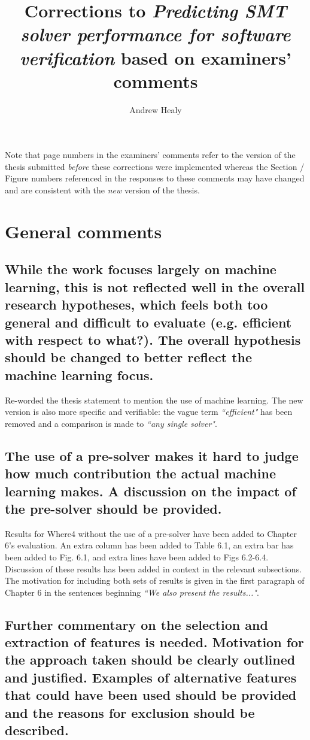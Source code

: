 \documentclass[]{article}
\title{Corrections to \emph{Predicting SMT solver performance for software verification} based on examiners' comments}
\author{Andrew Healy}
\begin{document}
\maketitle

Note that page numbers in the examiners' comments refer to the version of the thesis submitted \emph{before} these corrections were implemented whereas the Section / Figure numbers referenced in the responses to these comments may have changed and are consistent with the \emph{new} version of the thesis. 

\section{General comments}

\subsection{While the work focuses largely on machine learning, this is not reflected well in the overall research hypotheses, which feels both too general and difficult to evaluate (e.g. efficient with respect to what?). The overall hypothesis should be changed to better reflect the machine learning focus.}

\label{thesis-statement}

Re-worded the thesis statement to mention the use of machine learning. 
The new version is also more specific and verifiable: the vague term \emph{``efficient"} has been removed and a comparison is made to \emph{``any single solver"}.
 
\subsection{The use of a pre-solver makes it hard to judge how much contribution the actual machine learning makes. A discussion on the impact of the pre-solver should be provided.}
\label{presolving}
	
Results for \textsf{Where4} without the use	of a pre-solver have been added to Chapter 6's evaluation. An extra column has been added to Table 6.1, an extra bar has been added to Fig. 6.1, and extra lines have been added to Figs 6.2-6.4. Discussion of these results has been added in context in the relevant subsections. The motivation for including both sets of results is given in the first paragraph of Chapter 6 in the sentences beginning \emph{``We also present the results..."}.
	
\subsection{Further commentary on the selection and extraction of features is needed. Motivation for the approach taken should be clearly outlined and justified. Examples of alternative features that could have been used should be provided and the reasons for exclusion should be described.}
\label{features}
\end{document}
